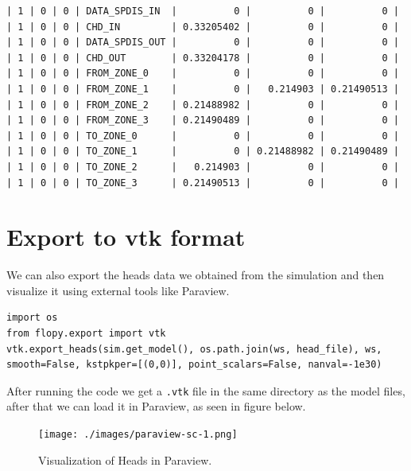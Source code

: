 \documentclass[titlepage,12pt]{unisubmission}
\begin{document}
\begin{verbatim}
| 1 | 0 | 0 | DATA_SPDIS_IN  |          0 |          0 |          0 |
| 1 | 0 | 0 | CHD_IN         | 0.33205402 |          0 |          0 |
| 1 | 0 | 0 | DATA_SPDIS_OUT |          0 |          0 |          0 |
| 1 | 0 | 0 | CHD_OUT        | 0.33204178 |          0 |          0 |
| 1 | 0 | 0 | FROM_ZONE_0    |          0 |          0 |          0 |
| 1 | 0 | 0 | FROM_ZONE_1    |          0 |   0.214903 | 0.21490513 |
| 1 | 0 | 0 | FROM_ZONE_2    | 0.21488982 |          0 |          0 |
| 1 | 0 | 0 | FROM_ZONE_3    | 0.21490489 |          0 |          0 |
| 1 | 0 | 0 | TO_ZONE_0      |          0 |          0 |          0 |
| 1 | 0 | 0 | TO_ZONE_1      |          0 | 0.21488982 | 0.21490489 |
| 1 | 0 | 0 | TO_ZONE_2      |   0.214903 |          0 |          0 |
| 1 | 0 | 0 | TO_ZONE_3      | 0.21490513 |          0 |          0 |
\end{verbatim}

\section{Export to vtk format}
\label{sec:org51ec253}

We can also export the heads data we obtained from the simulation and then visualize it using external tools like Paraview.

\begin{verbatim}
import os
from flopy.export import vtk
vtk.export_heads(sim.get_model(), os.path.join(ws, head_file), ws, smooth=False, kstpkper=[(0,0)], point_scalars=False, nanval=-1e30)
\end{verbatim}

After running the code we get a \texttt{.vtk} file in the same directory as the model files, after that we can load it in Paraview, as seen in figure below.

\begin{figure}[htbp]
\centering
\texttt{[image: ./images/paraview-sc-1.png]}
\caption{Visualization of Heads in Paraview.}
\end{figure}
\end{document}
